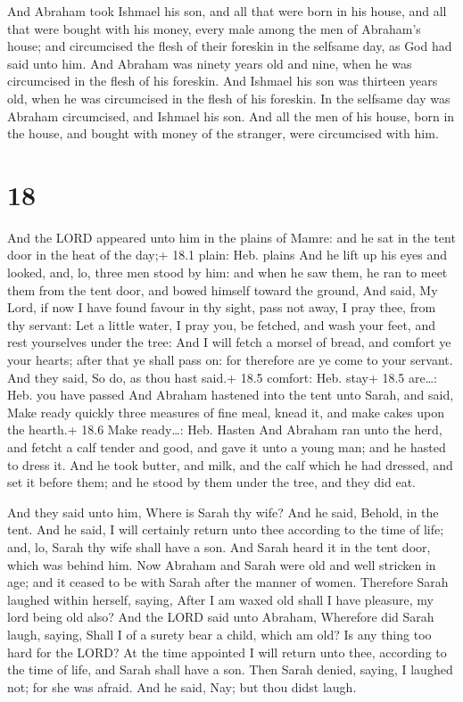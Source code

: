  And Abraham took Ishmael his son, and all that were born
in his house, and all that were bought with his money, every male among
the men of Abraham's house; and circumcised the flesh of their foreskin
in the selfsame day, as God had said unto him.  And Abraham
was ninety years old and nine, when he was circumcised in the flesh of
his foreskin.  And Ishmael his son was thirteen years old,
when he was circumcised in the flesh of his foreskin.  In
the selfsame day was Abraham circumcised, and Ishmael his son.
 And all the men of his house, born in the house, and
bought with money of the stranger, were circumcised with him.

\hypertarget{section-17}{%
\section{18}\label{section-17}}

 And the LORD appeared unto him in the plains of Mamre: and
he sat in the tent door in the heat of the day;+ 18.1 plain: Heb. plains
 And he lift up his eyes and looked, and, lo, three men
stood by him: and when he saw them, he ran to meet them from the tent
door, and bowed himself toward the ground,  And said, My
Lord, if now I have found favour in thy sight, pass not away, I pray
thee, from thy servant:  Let a little water, I pray you, be
fetched, and wash your feet, and rest yourselves under the tree:
 And I will fetch a morsel of bread, and comfort ye your
hearts; after that ye shall pass on: for therefore are ye come to your
servant. And they said, So do, as thou hast said.+ 18.5 comfort: Heb.
stay+ 18.5 are\ldots: Heb. you have passed  And Abraham
hastened into the tent unto Sarah, and said, Make ready quickly three
measures of fine meal, knead it, and make cakes upon the hearth.+ 18.6
Make ready\ldots: Heb. Hasten  And Abraham ran unto the
herd, and fetcht a calf tender and good, and gave it unto a young man;
and he hasted to dress it.  And he took butter, and milk,
and the calf which he had dressed, and set it before them; and he stood
by them under the tree, and they did eat.

 And they said unto him, Where is Sarah thy wife? And he
said, Behold, in the tent.  And he said, I will certainly
return unto thee according to the time of life; and, lo, Sarah thy wife
shall have a son. And Sarah heard it in the tent door, which was behind
him.  Now Abraham and Sarah were old and well stricken in
age; and it ceased to be with Sarah after the manner of women.
 Therefore Sarah laughed within herself, saying, After I am
waxed old shall I have pleasure, my lord being old also? 
And the LORD said unto Abraham, Wherefore did Sarah laugh, saying, Shall
I of a surety bear a child, which am old?  Is any thing too
hard for the LORD? At the time appointed I will return unto thee,
according to the time of life, and Sarah shall have a son. 
Then Sarah denied, saying, I laughed not; for she was afraid. And he
said, Nay; but thou didst laugh.

